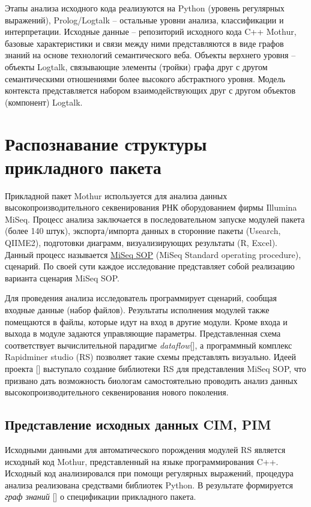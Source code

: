 \documentclass[12pt]{article}
\begin{document}
Этапы анализа исходного кода реализуются на Python (уровень регулярных
выражений), Prolog/Logtalk -- остальные уровни анализа, классификации и
интерпретации. Исходные данные -- репозиторий исходного кода C++ Mothur,
базовые характеристики и связи между ними представляются в виде графов
знаний на основе технологий семантического веба. Объекты верхнего уровня
-- объекты Logtalk, связывающие элементы (тройки) графа друг с другом
семантическими отношениями более высокого абстрактного уровня. Модель
контекста представляется набором взаимодействующих друг с другом
объектов (компонент) Logtalk.

\section{Распознавание структуры прикладного пакета}

Прикладной пакет Mothur используется для анализа данных высокопроизводительного секвенирования РНК оборудованием фирмы Illumina MiSeq.  Процесс анализа заключается в последовательном запуске модулей пакета (более 140 штук), экспорта/импорта данных в сторонние пакеты (Usearch, QIIME2), подготовки диаграмм, визуализирующих результаты (R, Excel).  Данный процесс называется \href{https://mothur.org/wiki/miseq_sop/}{MiSeq SOP} (MiSeq Standard operating procedure), сценарий.  По своей сути каждое исследование представляет собой реализацию варианта сценария MiSeq SOP.

Для проведения анализа исследователь программирует сценарий, сообщая входные данные (набор файлов).  Результаты исполнения модулей также помещаются в файлы, которые идут на вход в другие модули.  Кроме входа и выхода в модуле задаются управляющие параметры.  Представленная схема соответствует вычислительной парадигме \emph{dataflow}[], а программный комплекс Rapidminer studio (RS) позволяет такие схемы представлять визуально.  Идеей проекта [] выступало создание библиотеки RS для представления MiSeq SOP, что призвано дать возможность биологам самостоятельно проводить анализ данных высокопроизводительного секвенирования нового поколения.

\subsection{Представление исходных данных CIM, PIM}

Исходными данными для автоматического порождения модулей RS является исходный код Mothur, представленный на языке программирования C++.  Исходный код анализировался при помощи регулярных выражений, процедура анализа реализована средствами библиотек Python.  В результате формируется \emph{граф знаний} [] о спецификации прикладного пакета.
\end{document}
